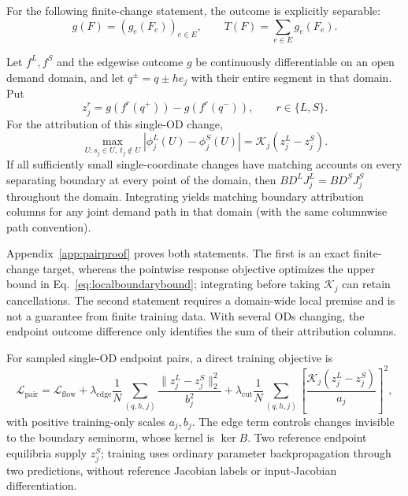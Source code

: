 For the following finite-change statement, the outcome is explicitly separable:
\[
g(F)=(g_e(F_e))_{e\in E},\qquad T(F)=\sum_{e\in E}g_e(F_e).
\]
\begin{proposition}\label{prop:pairboundary}
Let $f^L,f^S$ and the edgewise outcome $g$ be continuously differentiable
on an open demand domain, and let $q^\pm=q\pm h e_j$ with their entire
segment in that domain. Put
\[
z_j^r=g(f^r(q^+))-g(f^r(q^-)),\qquad r\in\{L,S\}.
\]
For the attribution of this single-OD change,
\begin{equation}
\max_{U:s_j\in U,\ t_j\notin U}|\phi_j^L(U)-\phi_j^S(U)|
=\mathcal K_j(z_j^L-z_j^S).\label{eq:pairboundaryexact}
\end{equation}
If all sufficiently small single-coordinate changes have matching
accounts on every separating boundary at every point of the domain,
then $BD^LJ_j^L=BD^SJ_j^S$ throughout the domain. Integrating yields
matching boundary attribution columns for any joint demand path in that
domain (with the same columnwise path convention).
\end{proposition}
Appendix~\ref{app:pairproof} proves both statements. The first is an
exact finite-change target, whereas the pointwise response objective
optimizes the upper bound in Eq.~\eqref{eq:localboundarybound}; integrating
before taking $\mathcal K_j$ can retain cancellations. The second statement
requires a domain-wide local premise and is not a guarantee from finite
training data. With several ODs changing, the endpoint outcome difference
only identifies the sum of their attribution columns.

For sampled single-OD endpoint pairs, a direct training objective is
\begin{equation}
\mathcal L_{\mathrm{pair}}=\mathcal L_{\mathrm{flow}}
+\lambda_{\mathrm{edge}}\frac1N\sum_{(q,h,j)}
\frac{\|z_j^L-z_j^S\|_2^2}{b_j^2}
+\lambda_{\mathrm{cut}}\frac1N\sum_{(q,h,j)}
\left[\frac{\mathcal K_j(z_j^L-z_j^S)}{a_j}\right]^2,
\label{eq:pairobjective}
\end{equation}
with positive training-only scales $a_j,b_j$. The edge term controls
changes invisible to the boundary seminorm, whose kernel is $\ker B$.
Two reference endpoint equilibria supply $z_j^S$; training uses ordinary
parameter backpropagation through two predictions, without reference
Jacobian labels or input-Jacobian differentiation.
